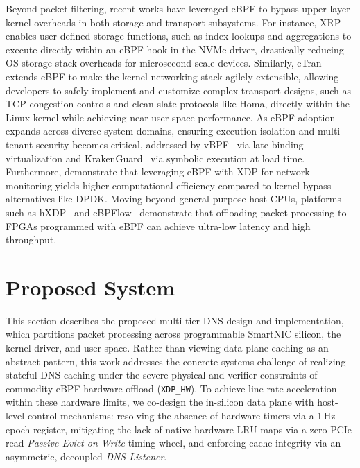 \documentclass[a4paper,fleqn,colorlinks,hidelinks]{cas-sc}
\begin{document}
Beyond packet filtering, recent works have leveraged eBPF to bypass upper-layer kernel overheads in both storage and transport subsystems. For instance, XRP~\citep{280870} enables user-defined storage functions, such as index lookups and aggregations to execute directly within an eBPF hook in the NVMe driver, drastically reducing OS storage stack overheads for microsecond-scale devices. Similarly, eTran~\citep{chen2025etran} extends eBPF to make the kernel networking stack agilely extensible, allowing developers to safely implement and customize complex transport designs, such as TCP congestion controls and clean-slate protocols like Homa, directly within the Linux kernel while achieving near user-space performance. As eBPF adoption expands across diverse system domains, ensuring execution isolation and multi-tenant security becomes critical, addressed by vBPF~\citep{zhang2026virtualizing} via late-binding virtualization and KrakenGuard~\citep{patel2026krakenguard} via symbolic execution at load time. Furthermore, \citet{9665095} demonstrate that leveraging eBPF with XDP for network monitoring yields higher computational efficiency compared to kernel-bypass alternatives like DPDK. Moving beyond general-purpose host CPUs, platforms such as hXDP~\citep{performance:hxdp} and eBPFlow~\citep{performance:ebpflow,networking:application_layer} demonstrate that offloading packet processing to FPGAs programmed with eBPF can achieve ultra-low latency and high throughput.

\section{Proposed System}
\label{sec:proposed_system}

This section describes the proposed multi-tier DNS design and implementation, which partitions packet processing across programmable SmartNIC silicon, the kernel driver, and user space. Rather than viewing data-plane caching as an abstract pattern, this work addresses the concrete systems challenge of realizing stateful DNS caching under the severe physical and verifier constraints of commodity eBPF hardware offload (\texttt{XDP\_HW}). To achieve line-rate acceleration within these hardware limits, we co-design the in-silicon data plane with host-level control mechanisms: resolving the absence of hardware timers via a 1\,Hz epoch register, mitigating the lack of native hardware LRU maps via a zero-PCIe-read \textit{Passive Evict-on-Write} timing wheel, and enforcing cache integrity via an asymmetric, decoupled \textit{DNS Listener}.
\end{document}
